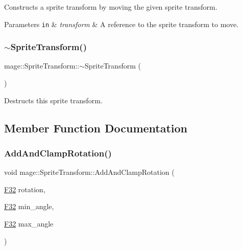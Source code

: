 Constructs a sprite transform by moving the given sprite transform.


\begin{DoxyParams}[1]{Parameters}
\mbox{\tt in}  & {\em transform} & A reference to the sprite transform to move. \\
\hline
\end{DoxyParams}
\hypertarget{structmage_1_1_sprite_transform_a14a3614023996cbb071c3de99f9528bc}{}\label{structmage_1_1_sprite_transform_a14a3614023996cbb071c3de99f9528bc} 
\subsubsection{\texorpdfstring{$\sim$\+Sprite\+Transform()}{~SpriteTransform()}}
{\footnotesize\ttfamily mage\+::\+Sprite\+Transform\+::$\sim$\+Sprite\+Transform (\begin{DoxyParamCaption}{ }\end{DoxyParamCaption})\hspace{0.3cm}{\ttfamily [default]}}

Destructs this sprite transform. 

\subsection{Member Function Documentation}
\hypertarget{structmage_1_1_sprite_transform_a29d41f069bb02f46bae495d1e9a19c9b}{}\label{structmage_1_1_sprite_transform_a29d41f069bb02f46bae495d1e9a19c9b} 
\subsubsection{\texorpdfstring{Add\+And\+Clamp\+Rotation()}{AddAndClampRotation()}}
{\footnotesize\ttfamily void mage\+::\+Sprite\+Transform\+::\+Add\+And\+Clamp\+Rotation (\begin{DoxyParamCaption}\item[{\hyperlink{namespacemage_aa97e833b45f06d60a0a9c4fc22ae02c0}{F32}}]{rotation,  }\item[{\hyperlink{namespacemage_aa97e833b45f06d60a0a9c4fc22ae02c0}{F32}}]{min\+\_\+angle,  }\item[{\hyperlink{namespacemage_aa97e833b45f06d60a0a9c4fc22ae02c0}{F32}}]{max\+\_\+angle }\end{DoxyParamCaption})\hspace{0.3cm}{\ttfamily [noexcept]}}


